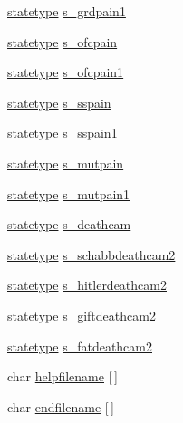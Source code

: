 \begin{DoxyCompactItemize}
\item 
\hyperlink{structstatestruct}{statetype} \hyperlink{WL__DEF_8H_a8e29ce2b8a415ba47460c294eda3b480}{s\_\-grdpain1}
\item 
\hyperlink{structstatestruct}{statetype} \hyperlink{WL__DEF_8H_acd795aa968a47e77109d917e6539e2b1}{s\_\-ofcpain}
\item 
\hyperlink{structstatestruct}{statetype} \hyperlink{WL__DEF_8H_aa5e50151f6cdf0e49996440f74ad691d}{s\_\-ofcpain1}
\item 
\hyperlink{structstatestruct}{statetype} \hyperlink{WL__DEF_8H_ab483f8908a6f7bdccb624e36aa194b10}{s\_\-sspain}
\item 
\hyperlink{structstatestruct}{statetype} \hyperlink{WL__DEF_8H_ae06c22cf4b2074ce1fb3225dfd84a54c}{s\_\-sspain1}
\item 
\hyperlink{structstatestruct}{statetype} \hyperlink{WL__DEF_8H_a9a4fddc816b63dd2533cb20ce08a0b6b}{s\_\-mutpain}
\item 
\hyperlink{structstatestruct}{statetype} \hyperlink{WL__DEF_8H_a9a4a31d3bf21ecf2c5a7f5c9b5c6f5d2}{s\_\-mutpain1}
\item 
\hyperlink{structstatestruct}{statetype} \hyperlink{WL__DEF_8H_a7f671914a2f6c20217c29103a1dca042}{s\_\-deathcam}
\item 
\hyperlink{structstatestruct}{statetype} \hyperlink{WL__DEF_8H_aa53a0a9974b2890636561f6b2ae9718a}{s\_\-schabbdeathcam2}
\item 
\hyperlink{structstatestruct}{statetype} \hyperlink{WL__DEF_8H_afdf8af207c8d90a248d36048685f0b6c}{s\_\-hitlerdeathcam2}
\item 
\hyperlink{structstatestruct}{statetype} \hyperlink{WL__DEF_8H_acd3aef0f32bb083902551e1d9fe413c7}{s\_\-giftdeathcam2}
\item 
\hyperlink{structstatestruct}{statetype} \hyperlink{WL__DEF_8H_a87ad79b0eb788fd0989054da6caead38}{s\_\-fatdeathcam2}
\item 
char \hyperlink{WL__DEF_8H_a9d0ece516d8fc9556aa1a6647f144922}{helpfilename} \mbox{[}$\,$\mbox{]}
\item 
char \hyperlink{WL__DEF_8H_a507c5edb33c02cb6d10285289532c356}{endfilename} \mbox{[}$\,$\mbox{]}
\end{DoxyCompactItemize}


